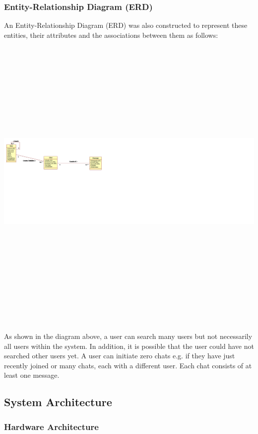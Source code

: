 \documentclass{article}
\begin{document}
\subsubsection{Entity-Relationship Diagram (ERD)}
An Entity-Relationship Diagram (ERD) was also constructed to represent these entities, their attributes and the associations between them as follows: \newline
\includegraphics[width=40cm, height=15cm]{erd_hermes}

As shown in the diagram above, a user can search many users but not necessarily all users within the system. In addition, it is possible that the user could have not searched other users yet. A user can initiate zero chats e.g. if they have just recently joined or many chats, each with a different user. Each chat consists of at least one message. \par

\subsection{System Architecture}

\subsubsection{Hardware Architecture}
\end{document}
